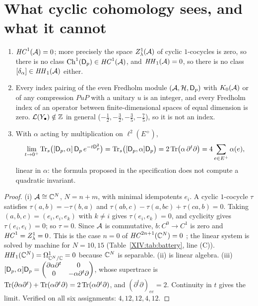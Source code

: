 \section{What cyclic cohomology sees, and what it cannot}\label{XIV:sec:nogo}

\begin{proposition}\label{XIV:prop:nogo}
\begin{enumerate}
\item[(i)] $\mathit{HC}^{1}(\mathcal{A})=0$; more precisely the space $Z^{1}_\lambda(\mathcal{A})$ of cyclic
$1$-cocycles is zero, so there is no class $\mathrm{Ch}^{1}(\mathsf{D}_p)\in\mathit{HC}^{1}(\mathcal{A})$, and
$\mathit{HH}_1(\mathcal{A})=0$, so there is no class $[\delta_\alpha]\in\mathit{HH}_1(\mathcal{A})$ either.
\item[(ii)] Every index pairing of the even Fredholm module $(\mathcal{A},\mathcal{H},\mathsf{D}_p)$ with $K_0(\mathcal{A})$
or of any compression $PuP$ with a unitary $u$ is an integer, and every Fredholm index of an
operator between finite-dimensional spaces of equal dimension is zero. $\mathcal{L}(Y_\bullet)\notin\mathbb{Z}$
in general ($-\frac12,-\frac32,-\frac35,-\frac75$), so it is not an index.
\item[(iii)] With $\alpha$ acting by multiplication on $\ell^{2}(E^{+})$,
\[
\lim_{t\to0^{+}}\operatorname{Tr}_s\bigl([\mathsf{D}_p,\alpha]\,\mathsf{D}_p\,e^{-t\mathsf{D}_p^{2}}\bigr)=\operatorname{Tr}_s\bigl([\mathsf{D}_p,\alpha]\mathsf{D}_p\bigr)
=2\operatorname{Tr}\bigl(\alpha\,\partial^{t}\partial\bigr)=4\sum_{e\in E^{+}}\alpha(e),
\]
linear in $\alpha$: the formula proposed in the specification does not compute a quadratic
invariant.
\end{enumerate}
\end{proposition}

\begin{proof}
(i) $\mathcal{A}\cong\mathbb{C}^{N}$, $N=n+m$, with minimal idempotents $e_i$. A cyclic $1$-cocycle
$\tau$ satisfies $\tau(a,b)=-\tau(b,a)$ and $\tau(ab,c)-\tau(a,bc)+\tau(ca,b)=0$. Taking
$(a,b,c)=(e_i,e_i,e_k)$ with $k\ne i$ gives $\tau(e_i,e_k)=0$, and cyclicity gives
$\tau(e_i,e_i)=0$; so $\tau=0$. Since $\mathcal{A}$ is commutative, $b\colon C^{0}\to C^{1}$ is zero
and $\mathit{HC}^{1}=Z^{1}_\lambda=0$. This is the case $n=0$ of $\mathit{HC}^{2n+1}(\mathbb{C}^{N})=0$
\cite[2.1.12]{Lo}; the linear system is solved by machine for $N=10,15$
(Table~\ref{XIV:tab:battery}, line (C)). $\mathit{HH}_1(\mathbb{C}^{N})=\Omega^{1}_{\mathbb{C}^{N}/\mathbb{C}}=0$ because
$\mathbb{C}^{N}$ is separable. (ii) is linear algebra. (iii) $[\mathsf{D}_p,\alpha]\mathsf{D}_p=
\begin{pmatrix}\partial\alpha\partial^{t}&0\\0&-\alpha\partial^{t}\partial\end{pmatrix}$,
whose supertrace is $\operatorname{Tr}(\partial\alpha\partial^{t})+\operatorname{Tr}(\alpha\partial^{t}\partial)
=2\operatorname{Tr}(\alpha\partial^{t}\partial)$, and $(\partial^{t}\partial)_{ee}=2$. Continuity in $t$
gives the limit. Verified on all six assignments: $4,12,12,4,12$.
\end{proof}

